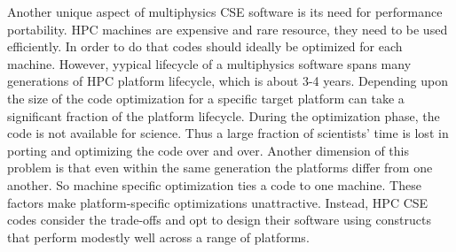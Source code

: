 Another unique aspect of multiphysics CSE software is its need for
performance portability. HPC machines are expensive and rare resource,
they need to be used efficiently. In order to do that codes should
ideally be optimized for each machine. However, yypical lifecycle of a
multiphysics software spans many generations of HPC platform
lifecycle, which is about 3-4 years. Depending upon the size of the
code optimization for a specific target platform can take a
significant fraction of the platform lifecycle. During the
optimization phase, the code is not available for science. Thus a
large fraction of scientists' time is lost in porting and optimizing
the code over and over. Another dimension of this problem is that even
within the same generation the platforms differ from one another. So
machine specific optimization ties a code to one machine. These
factors make platform-specific optimizations unattractive. Instead,
HPC CSE codes consider the trade-offs and opt to design their software
using constructs that perform modestly well across a range of
platforms. 


